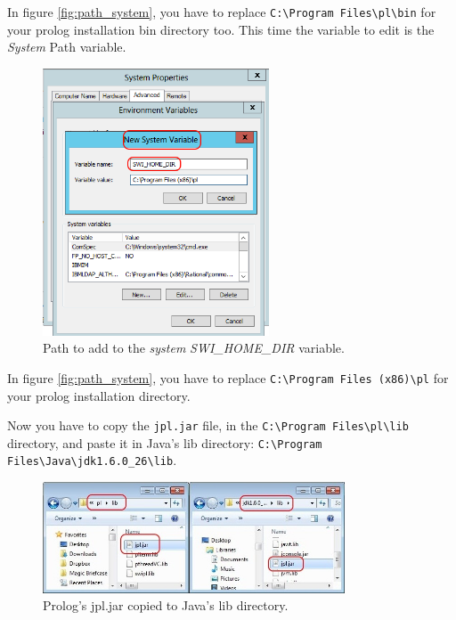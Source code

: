 In figure \ref{fig:path_system}, you have to replace \verb=C:\Program Files\pl\bin= for your prolog installation
bin directory too. This time the variable to edit is the \emph{System} Path
variable.

\begin{figure}[h]
\begin{center}
  \includegraphics[width=0.6\textwidth]{imgs/swi_prolog_path.png}
  \caption{Path to add to the \emph{system} \emph{SWI\_HOME\_DIR} variable.}
  \label{fig:swi_pl_path}
\end{center}
\end{figure}

In figure \ref{fig:path_system}, you have to replace \verb=C:\Program Files (x86)\pl= for your prolog installation
directory.

Now you have to copy the \verb=jpl.jar= file, in the 
\verb=C:\Program Files\pl\lib= 
directory, and paste it in Java's lib directory: 
\verb=C:\Program Files\Java\jdk1.6.0_26\lib=.

\begin{figure}[h]
\begin{center}
  \includegraphics[width=0.8\textwidth]{imgs/jpl_cpy.jpg}
  \caption{Prolog's jpl.jar copied to Java's lib directory.}
  \label{fig:jpl_cpy}
\end{center}
\end{figure}

